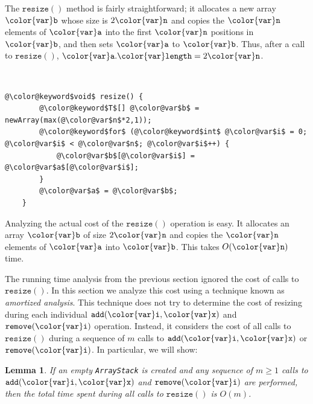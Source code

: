 \documentclass[10pt]{book}
\theoremstyle{plain}
\newtheorem{lem}{Lemma}[chapter]
\newcommand{\lemlabel}[1]{\label{lem:#1}}
\theoremstyle{definition}
\begin{document}
The \ensuremath{\mathtt{resize()}} method is fairly straightforward; it allocates a new
array \ensuremath{\mathtt{{\color{var}b}}} whose size is $2\ensuremath{\mathtt{{\color{var}n}}}$ and copies the \ensuremath{\mathtt{{\color{var}n}}} elements of \ensuremath{\mathtt{{\color{var}a}}} into
the first \ensuremath{\mathtt{{\color{var}n}}} positions in \ensuremath{\mathtt{{\color{var}b}}}, and then sets \ensuremath{\mathtt{{\color{var}a}}} to \ensuremath{\mathtt{{\color{var}b}}}. Thus, after a call to \ensuremath{\mathtt{resize()}}, $\ensuremath{\mathtt{{\color{var}a}.{\color{var}length}}} = 2\ensuremath{\mathtt{{\color{var}n}}}$.



 \ \vspace{.5ex}\begin{Verbatim}[gobble=1,tabsize=2,frame=single,framerule=1.2pt,commandchars=\\@\$,label=\texttt{ArrayStack},labelposition=topline]
	@\color@keyword$void$ resize() {
		@\color@keyword$T$[] @\color@var$b$ = newArray(max(@\color@var$n$*2,1));
		@\color@keyword$for$ (@\color@keyword$int$ @\color@var$i$ = 0; @\color@var$i$ < @\color@var$n$; @\color@var$i$++) {
			@\color@var$b$[@\color@var$i$] = @\color@var$a$[@\color@var$i$];
		}
		@\color@var$a$ = @\color@var$b$;
	}
\end{Verbatim}


Analyzing the actual cost of the \ensuremath{\mathtt{resize()}} operation is easy. It
allocates an array \ensuremath{\mathtt{{\color{var}b}}} of size $2\ensuremath{\mathtt{{\color{var}n}}}$ and copies the \ensuremath{\mathtt{{\color{var}n}}} elements of \ensuremath{\mathtt{{\color{var}a}}}
into \ensuremath{\mathtt{{\color{var}b}}}.  This takes $O(\ensuremath{\mathtt{{\color{var}n}}})$ time.

The running time analysis from the previous section ignored the cost
of calls to \ensuremath{\mathtt{resize()}}.  In this section we analyze this cost using a
technique known as \emph{amortized analysis}.  This technique does not
try to determine the cost of resizing during each individual \ensuremath{\mathtt{add({\color{var}i},{\color{var}x})}}
and \ensuremath{\mathtt{remove({\color{var}i})}} operation.  Instead, it considers the cost of all calls to
\ensuremath{\mathtt{resize()}} during a sequence of $m$ calls to \ensuremath{\mathtt{add({\color{var}i},{\color{var}x})}} or \ensuremath{\mathtt{remove({\color{var}i})}}.
In particular, we will show:

\begin{lem}\lemlabel{arraystack-amortized}
  If an empty \texttt{ArrayStack} is created and any sequence of $m\ge 1$ calls
  to \ensuremath{\mathtt{add({\color{var}i},{\color{var}x})}} and \ensuremath{\mathtt{remove({\color{var}i})}} are performed, then the total time spent
  during all calls to \ensuremath{\mathtt{resize()}} is $O(m)$.
\end{lem}
\end{document}

